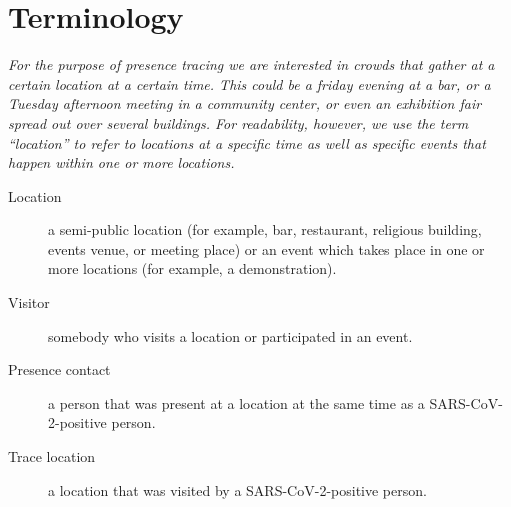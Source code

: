 \section{Terminology}

\emph{For the purpose of presence tracing we are interested in crowds that gather at a certain location at a certain time. This could be a friday evening at a bar, or a Tuesday afternoon meeting in a community center, or even an exhibition fair spread out over several buildings. For readability, however, we use the term “location” to refer to locations at a specific time as well as specific events that happen within one or more locations.}

\begin{description}
\item[Location] a semi-public location (for example, bar, restaurant, religious building, events venue, or meeting place) or an event which takes place in one or more locations (for example, a demonstration).
\item[Visitor] somebody who visits a location or participated in an event.
\item[Presence contact] a person that was present at a location at the same time as a SARS-CoV-2-positive person.
\item[Trace location] a location that was visited by a SARS-CoV-2-positive person.
\end{description}
